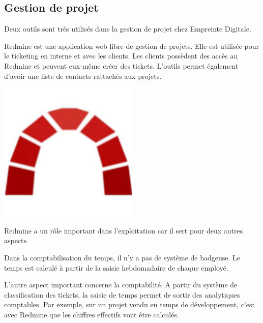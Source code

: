 \documentclass[12pt]{article}
\begin{document}
\newpage
\subsection{Gestion de projet}
Deux outils sont très utilisés dans la gestion de projet chez Empreinte Digitale. \\

\noindent%
\begin{minipage}{.7\textwidth}%
\gls{Redmine} est une application web libre de gestion de projets.
Elle est utilisée pour le ticketing en interne et avec les clients.
Les clients possèdent des accès au \gls{Redmine} et peuvent eux-même créer des tickets.
L'outils permet également d'avoir une liste de contacts rattachés aux projets. \\
\end{minipage}%
\hfill
\begin{minipage}{.3\textwidth}%
\begin{center}
\includegraphics[width=0.5\textwidth]{src/logo_redmine.jpeg}
\end{center}
\end{minipage}%

\gls{Redmine} a un rôle important dans l'exploitation car il sert pour deux autres aspects.

Dans la comptabilisation du temps, il n'y a pas de système de badgeuse.
Le temps est calculé à partir de la saisie hebdomadaire de chaque employé.

L'autre aspect important concerne la comptabilité.
A partir du système de classification des tickets, la saisie de temps permet de sortir des analytiques comptables.
Par exemple, sur un projet vendu en temps de développement, c'est avec \gls{Redmine} que les chiffres effectifs vont être calculés. \\
\end{document}
